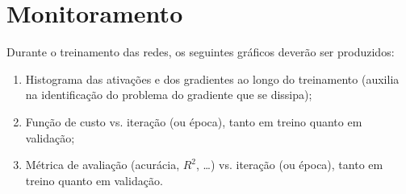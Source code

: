 \documentclass{dlproblemset}
\begin{document}
\section*{Monitoramento}

Durante o treinamento das redes, os seguintes gráficos deverão ser produzidos:

\begin{enumerate}[1)]
    \item Histograma das ativações e dos gradientes ao longo do treinamento (auxilia na identificação do problema do gradiente que se dissipa);
    \item Função de custo vs. iteração (ou época), tanto em treino quanto em validação;
    \item Métrica de avaliação (acurácia, $R^2$, \ldots) vs. iteração (ou época), tanto em treino quanto em validação.
\end{enumerate}
\end{document}
